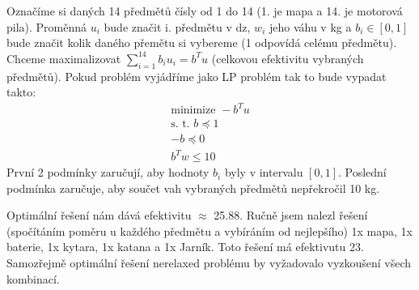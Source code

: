 \documentclass[12pt, a4paper]{article}
\begin{document}
\section{}
Označíme si daných 14 předmětů čísly od 1 do 14 (1. je mapa a 14. je motorová pila). Proměnná $u_i$ bude značit  i. předmětu v dz, $w_i$ jeho váhu v kg a $b_i \in [0,1]$ bude značit kolik daného přemětu si vybereme (1 odpovídá celému předmětu). Chceme maximalizovat $\sum_{i=1}^{14} b_i u_i = b^T u$ (celkovou efektivitu vybraných předmětů). Pokud problém vyjádříme jako LP problém tak to bude vypadat takto:
\begin{gather*}
\text{minimize } -b^T u\\
\text{s. t. } b \preceq 1\\
-b \preceq 0\\
b^T w \leq 10
\end{gather*}
První 2 podmínky zaručují, aby hodnoty $b_i$ byly v intervalu $[0,1]$. Poslední podmínka zaručuje, aby součet vah vybraných předmětů nepřekročil 10 kg.

Optimální řešení nám dává efektivitu $\approx$ 25.88. Ručně jsem nalezl řešení (spočítáním poměru  u každého předmětu a vybíráním od nejlepšího) 1x mapa, 1x baterie, 1x kytara, 1x katana a 1x Jarník. Toto řešení má efektivutu 23. Samozřejmě optimální řešení nerelaxed problému by vyžadovalo vyzkoušení všech kombinací.
\end{document}
